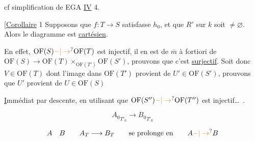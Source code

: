 cf simplification  de EGA \uline{IV} 4.

[\uline{Corollaire} 1 Supposons que $f:T\to S$ satisfasse $h_0$, et que $R'$ sur $k$ soit $\ne\varnothing$. Alors le diagramme
est \uline{cartésien}.

En effet, $\mathrm{OF}(S)\unsure{-|\to}\mathrm{OF}(T)$ est injectif, il en est de $\overline m$ à fortiori de $\mathrm{OF}(S)\to\mathrm{OF}(T)\times_{\mathrm{OF}(T')}\mathrm{OF}(S')$, prouvons que c'est \uline{surjectif}. Soit donc $V\in\mathrm{OF}(T)$ dont l'image dans $\mathrm{OF}(T')$ provient de $U'\in\mathrm{OF}(S')$, prouvons que $U'$ provient de $U\in\mathrm{OF}(S)$

\uline{I}mmédiat par descente, en utilisant que $\mathrm{OF}(S'')\unsure{-|\to}\mathrm{OF}(T'')$ est injectif\ldots\ .


\[
{A_0}_{T'_0}\longrightarrow {B_0}_{T'_0}
\]

\[
A\quad B\qquad A_T\longrightarrow B_T\qquad\text{se prolonge en}\qquad A\unsure{-|\to}B
\]


